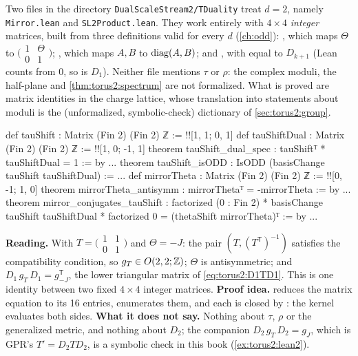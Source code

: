 Two files in the directory \texttt{DualScaleStream2/TDuality} treat $d=2$, namely
\texttt{Mirror.lean} and \texttt{SL2Product.lean}. They work entirely with $4\times4$
\emph{integer} matrices, built from three definitions valid for every $d$ (\cref{ch:odd}):
, which maps $\Theta$ to
$\big(\begin{smallmatrix}1&\Theta\\0&1\end{smallmatrix}\big)$; , which
maps $A,B$ to $\operatorname{diag}(A,B)$; and , with  equal to
$D_{k+1}$ (Lean counts from $0$, so  is $D_1$). Neither file mentions $\tau$ or
$\rho$: the complex moduli, the half-plane and \cref{thm:torus2:spectrum} are not
formalized. What is proved are matrix identities in the charge lattice, whose translation
into statements about moduli is the (unformalized, symbolic-check) dictionary of
\cref{sec:torus2:group}.

\begin{leanbox}
\begin{leancode}
def tauShift : Matrix (Fin 2) (Fin 2) ℤ := !![1, 1; 0, 1]
def tauShiftDual : Matrix (Fin 2) (Fin 2) ℤ := !![1, 0; -1, 1]
theorem tauShift_dual_spec : tauShiftᵀ * tauShiftDual = 1 := by ...
theorem tauShift_isODD : IsODD (basisChange tauShift tauShiftDual) := ...
def mirrorTheta : Matrix (Fin 2) (Fin 2) ℤ := !![0, -1; 1, 0]
theorem mirrorTheta_antisymm : mirrorThetaᵀ = -mirrorTheta := by ...
theorem mirror_conjugates_tauShift :
    factorized (0 : Fin 2) * basisChange tauShift tauShiftDual * factorized 0 =
      (thetaShift mirrorTheta)ᵀ := by ...
\end{leancode}
\textbf{Reading.} With $T=\big(\begin{smallmatrix}1&1\\0&1\end{smallmatrix}\big)$ and
$\Theta=-J$: the pair $(T,(T^{\mathsf T})^{-1})$ satisfies the compatibility condition, so
$g_T\in O(2,2;\mathbb{Z})$; $\Theta$ is antisymmetric; and
$D_1\,g_T\,D_1=g_{-J}^{\mathsf T}$, the lower triangular matrix of
\eqref{eq:torus2:D1TD1}. This is one identity between two fixed $4\times4$ integer matrices.
\textbf{Proof idea.}  reduces the matrix equation to its 16 entries,
 enumerates them, and each is closed by : the kernel evaluates
both sides. \textbf{What it does not say.} Nothing about $\tau$, $\rho$ or the generalized
metric, and nothing about $D_2$; the companion $D_2\,g_T\,D_2=g_J$, which is GPR's
$T'=D_2TD_2$, is a symbolic check in this book (\cref{ex:torus2:lean2}).
\end{leanbox}

